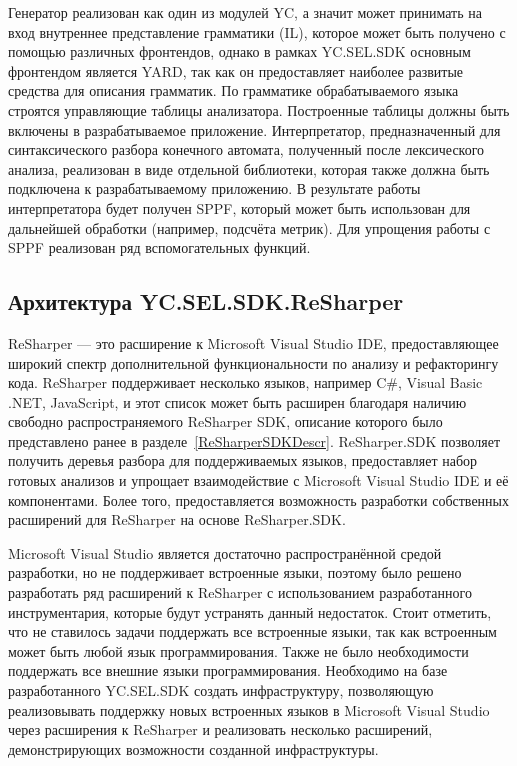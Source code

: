 Генератор реализован как один из модулей YC, а значит может принимать на вход внутреннее представление грамматики (IL), которое может быть получено с помощью различных фронтендов, однако в рамках YC.SEL.SDK основным фронтендом является YARD, так как он предоставляет наиболее развитые средства для описания грамматик. По грамматике обрабатываемого языка строятся управляющие таблицы анализатора. Построенные таблицы должны быть включены в разрабатываемое приложение. Интерпретатор, предназначенный для синтаксического разбора конечного автомата, полученный после лексического анализа, реализован в виде отдельной библиотеки, которая также должна быть подключена к разрабатываемому приложению. В результате работы интерпретатора будет получен SPPF, который может быть использован для дальнейшей обработки (например, подсчёта метрик). Для упрощения работы с SPPF реализован ряд вспомогательных функций.

\subsection{Архитектура YC.SEL.SDK.ReSharper}

ReSharper --- это расширение к Microsoft Visual Studio IDE, предоставляющее широкий спектр  дополнительной функциональности по анализу и рефакторингу кода. ReSharper поддерживает несколько языков, например C\#, Visual Basic .NET, JavaScript, и этот список может быть расширен благодаря наличию свободно распространяемого ReSharper SDK, описание которого было представлено ранее в разделе~\ref{ReSharperSDKDescr}. ReSharper.SDK позволяет получить деревья разбора для поддерживаемых языков, предоставляет набор готовых анализов и упрощает взаимодействие с Microsoft Visual Studio IDE и её компонентами. Более того, предоставляется возможность разработки собственных расширений для ReSharper на основе ReSharper.SDK.

Microsoft Visual Studio является достаточно распространённой средой разработки, но не поддерживает встроенные языки, поэтому было решено разработать ряд расширений к ReSharper с использованием разработанного инструментария, которые будут устранять данный недостаток. Стоит отметить, что не ставилось задачи поддержать все встроенные языки, так как встроенным может быть любой язык программирования. Также не было необходимости поддержать все внешние языки программирования. Необходимо на базе разработанного YC.SEL.SDK создать инфраструктуру, позволяющую реализовывать поддержку новых встроенных языков в Microsoft Visual Studio через расширения к ReSharper и реализовать несколько расширений, демонстрирующих возможности созданной инфраструктуры. 

